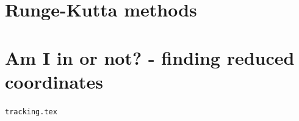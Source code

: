 \section{Runge-Kutta methods \label{ss:rkm}}
 

\section{Am I in or not? - finding reduced coordinates}\label{sec:amiin}
\begin{flushright} {\tiny {\color{gray} \tt tracking.tex}} \end{flushright}
 
